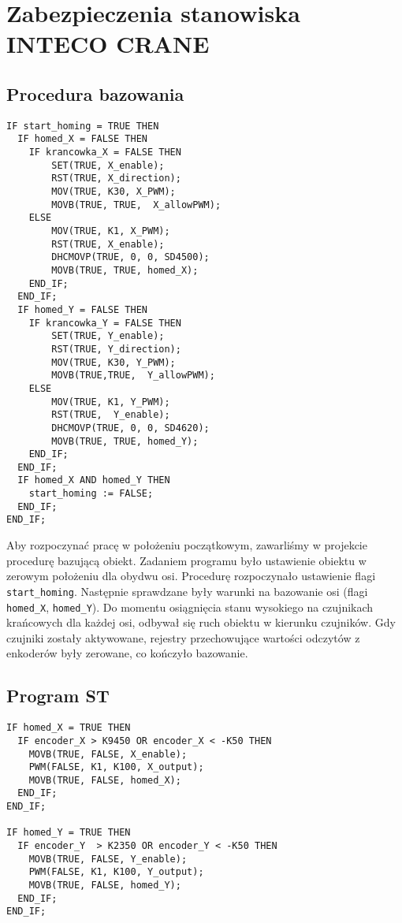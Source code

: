 \chapter{Zabezpieczenia stanowiska INTECO CRANE}
\label{inteco_zabezpieczenie}

\section{Procedura bazowania}
\label{homecoming}
\begin{lstlisting}
IF start_homing = TRUE THEN	
  IF homed_X = FALSE THEN
	IF krancowka_X = FALSE THEN
		SET(TRUE, X_enable); 
		RST(TRUE, X_direction);
		MOV(TRUE, K30, X_PWM);
		MOVB(TRUE, TRUE,  X_allowPWM);
	ELSE
		MOV(TRUE, K1, X_PWM);
		RST(TRUE, X_enable);
		DHCMOVP(TRUE, 0, 0, SD4500); 
		MOVB(TRUE, TRUE, homed_X);
	END_IF;
  END_IF;	
  IF homed_Y = FALSE THEN
	IF krancowka_Y = FALSE THEN
		SET(TRUE, Y_enable); 
		RST(TRUE, Y_direction);
		MOV(TRUE, K30, Y_PWM);
		MOVB(TRUE,TRUE,  Y_allowPWM);
	ELSE
		MOV(TRUE, K1, Y_PWM);
		RST(TRUE,  Y_enable);
		DHCMOVP(TRUE, 0, 0, SD4620); 
		MOVB(TRUE, TRUE, homed_Y);
	END_IF;
  END_IF;	
  IF homed_X AND homed_Y THEN
	start_homing := FALSE;
  END_IF;	
END_IF;
\end{lstlisting}


Aby rozpoczynać pracę w położeniu początkowym, zawarliśmy w projekcie procedurę bazującą obiekt. Zadaniem programu było ustawienie obiektu w zerowym położeniu dla obydwu osi. Procedurę rozpoczynało ustawienie flagi \verb+start_homing+. Następnie sprawdzane były warunki na bazowanie osi (flagi \verb+homed_X+, \verb+homed_Y+). Do momentu osiągnięcia stanu wysokiego na czujnikach krańcowych dla każdej osi, odbywał się ruch obiektu w kierunku czujników. Gdy czujniki zostały aktywowane, rejestry przechowujące wartości odczytów z enkoderów były zerowane, co kończyło bazowanie.\\

\section{Program ST}
\label{program_zabezpieczenia}

\begin{lstlisting}
IF homed_X = TRUE THEN
  IF encoder_X > K9450 OR encoder_X < -K50 THEN
	MOVB(TRUE, FALSE, X_enable);
	PWM(FALSE, K1, K100, X_output);
	MOVB(TRUE, FALSE, homed_X);
  END_IF;
END_IF;

IF homed_Y = TRUE THEN
  IF encoder_Y  > K2350 OR encoder_Y < -K50 THEN
	MOVB(TRUE, FALSE, Y_enable);
	PWM(FALSE, K1, K100, Y_output);
	MOVB(TRUE, FALSE, homed_Y);
  END_IF;
END_IF;
\end{lstlisting}

